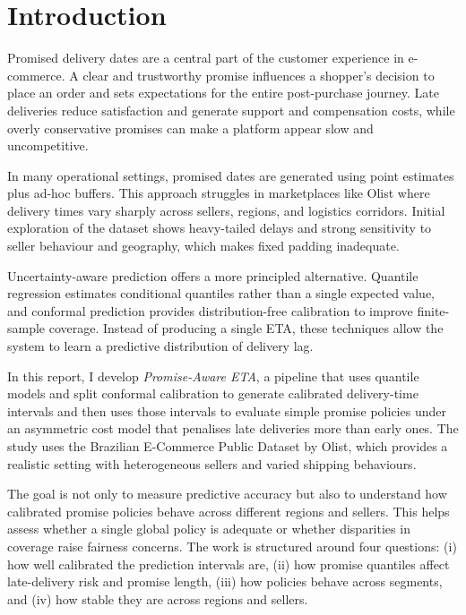 \documentclass[12pt]{article}
\begin{document}
\newpage

\section{Introduction}

Promised delivery dates are a central part of the customer experience in e-commerce. A clear and trustworthy promise influences a shopper’s decision to place an order and sets expectations for the entire post-purchase journey. Late deliveries reduce satisfaction and generate support and compensation costs, while overly conservative promises can make a platform appear slow and uncompetitive.

In many operational settings, promised dates are generated using point estimates plus ad-hoc buffers. This approach struggles in marketplaces like Olist where delivery times vary sharply across sellers, regions, and logistics corridors. Initial exploration of the dataset shows heavy-tailed delays and strong sensitivity to seller behaviour and geography, which makes fixed padding inadequate.

Uncertainty-aware prediction offers a more principled alternative. Quantile regression estimates conditional quantiles rather than a single expected value, and conformal prediction provides distribution-free calibration to improve finite-sample coverage. Instead of producing a single ETA, these techniques allow the system to learn a predictive distribution of delivery lag.

In this report, I develop \emph{Promise-Aware ETA}, a pipeline that uses quantile models and split conformal calibration to generate calibrated delivery-time intervals and then uses those intervals to evaluate simple promise policies under an asymmetric cost model that penalises late deliveries more than early ones. The study uses the Brazilian E-Commerce Public Dataset by Olist, which provides a realistic setting with heterogeneous sellers and varied shipping behaviours.

The goal is not only to measure predictive accuracy but also to understand how calibrated promise policies behave across different regions and sellers. This helps assess whether a single global policy is adequate or whether disparities in coverage raise fairness concerns. The work is structured around four questions: (i) how well calibrated the prediction intervals are, (ii) how promise quantiles affect late-delivery risk and promise length, (iii) how policies behave across segments, and (iv) how stable they are across regions and sellers.
\end{document}
